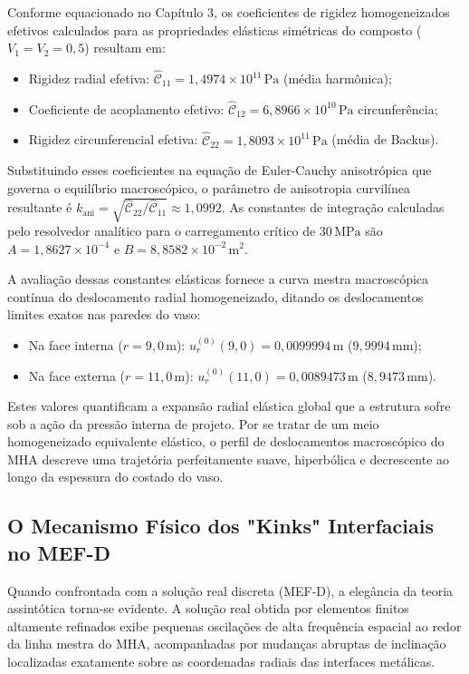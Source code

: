 Conforme equacionado no Capítulo 3, os coeficientes de rigidez homogeneizados efetivos calculados para as propriedades elásticas simétricas do composto ($V_1 = V_2 = 0,5$) resultam em:
\begin{itemize}
  \item Rigidez radial efetiva: $\hat{\mathcal{C}}_{11} = 1,4974 \times 10^{11} \, \text{Pa}$ (média harmônica);
  \item Coeficiente de acoplamento efetivo: $\hat{\mathcal{C}}_{12} = 6,8966 \times 10^{10} \, \text{Pa}$ circunferência;
  \item Rigidez circunferencial efetiva: $\hat{\mathcal{C}}_{22} = 1,8093 \times 10^{11} \, \text{Pa}$ (média de Backus).
\end{itemize}

Substituindo esses coeficientes na equação de Euler-Cauchy anisotrópica que governa o equilíbrio macroscópico, o parâmetro de anisotropia curvilínea resultante é $k_{\text{ani}} = \sqrt{\hat{\mathcal{C}}_{22} / \hat{\mathcal{C}}_{11}} \approx 1,0992$. As constantes de integração calculadas pelo resolvedor analítico para o carregamento crítico de $30 \, \text{MPa}$ são $A = 1,8627 \times 10^{-4}$ e $B = 8,8582 \times 10^{-2} \, \text{m}^2$.

A avaliação dessas constantes elásticas fornece a curva mestra macroscópica contínua do deslocamento radial homogeneizado, ditando os deslocamentos limites exatos nas paredes do vaso:
\begin{itemize}
  \item Na face interna ($r = 9,0 \, \text{m}$): $u_r^{(0)} (9,0) = 0,0099994 \, \text{m}$ ($9,9994 \, \text{mm}$);
  \item Na face externa ($r = 11,0 \, \text{m}$): $u_r^{(0)} (11,0) = 0,0089473 \, \text{m}$ ($8,9473 \, \text{mm}$).
\end{itemize}

Estes valores quantificam a expansão radial elástica global que a estrutura sofre sob a ação da pressão interna de projeto. Por se tratar de um meio homogeneizado equivalente elástico, o perfil de deslocamentos macroscópico do MHA descreve uma trajetória perfeitamente suave, hiperbólica e decrescente ao longo da espessura do costado do vaso.

\subsection{O Mecanismo Físico dos "Kinks" Interfaciais no MEF-D}

Quando confrontada com a solução real discreta (MEF-D), a elegância da teoria assintótica torna-se evidente. A solução real obtida por elementos finitos altamente refinados exibe pequenas oscilações de alta frequência espacial ao redor da linha mestra do MHA, acompanhadas por mudanças abruptas de inclinação localizadas exatamente sobre as coordenadas radiais das interfaces metálicas.

